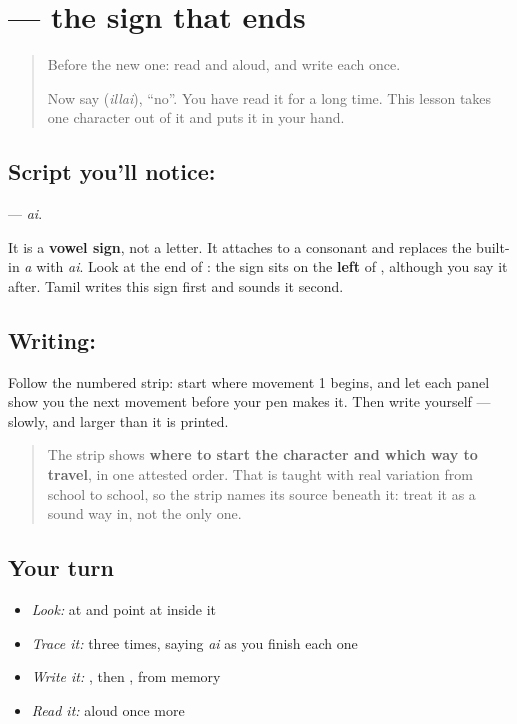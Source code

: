 \section[\texorpdfstring{\ta{ை} (ai)}{ை (ai)}]{ — the sign that ends }

\label{lesson:TA-S128-vowel-sign-ai}



\begin{quote}
Before the new one: read  and  aloud, and write each once.

Now say \textbf{} (\emph{illai}), \textquotedblleft{}no\textquotedblright{}. You have read it for a long time. This lesson takes one character out of it and puts it in your hand.
\end{quote}

\subsection*{Script you'll notice: }
\textbf{} — \emph{ai}.

It is a \textbf{vowel sign}, not a letter. It attaches to a consonant and replaces the built-in \emph{a} with \emph{ai}. Look at the end of \textbf{}: the sign sits on the \textbf{left} of , although you say it after. Tamil writes this sign first and sounds it second.

\subsection*{Writing: }

Follow the numbered strip: start where movement 1 begins, and let each panel show you the next movement before your pen makes it. Then write  yourself — slowly, and larger than it is printed.

\begin{quote}
The strip shows \textbf{where to start the character and which way to travel}, in one attested order. That is taught with real variation from school to school, so the strip names its source beneath it: treat it as a sound way in, not the only one.
\end{quote}

\subsection*{Your turn}
\begin{itemize}
\raggedright
  \item \emph{Look:} at \textbf{} and point at  inside it
  \item \emph{Trace it:}  three times, saying \emph{ai} as you finish each one
  \item \emph{Write it:} , then , from memory
  \item \emph{Read it:} \textbf{} aloud once more
\end{itemize}

